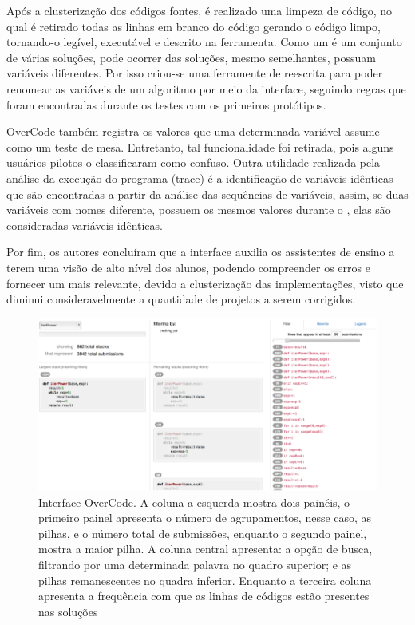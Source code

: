 	    Após a clusterização dos códigos fontes, é realizado uma limpeza de código,
	    no qual é retirado todas as linhas em branco do código gerando o código limpo,
	    tornando-o legível, executável e descrito na ferramenta. Como um 
	    é um conjunto de várias soluções, pode ocorrer das soluções, mesmo semelhantes,
	    possuam variáveis diferentes. Por isso criou-se uma ferramente de reescrita
	    para poder renomear as variáveis de um algoritmo por meio da interface,
	    seguindo regras que foram encontradas durante os testes com os primeiros protótipos.
	    
	    OverCode também registra os valores que uma determinada variável assume como
	    um teste de mesa. Entretanto, tal funcionalidade foi retirada, pois alguns
	    usuários pilotos o classificaram como confuso. Outra utilidade realizada pela
	    análise da execução do programa (trace) é a identificação de variáveis idênticas
	    que são encontradas a partir da análise das sequências de variáveis, assim, se
	    duas variáveis com nomes diferente, possuem os mesmos valores durante o
	    , elas são consideradas variáveis idênticas.
	    
	    Por fim, os autores concluíram que a interface auxilia os assistentes de
	    ensino a terem uma visão de alto nível dos alunos, podendo compreender os
	    erros e fornecer um  mais relevante, devido a clusterização
	    das implementações, visto que diminui consideravelmente a quantidade de
	    projetos a serem corrigidos.
	    
	    \begin{figure}[ht]
	        \centering
	        \includegraphics[scale=0.4]{imagem/overCode.png}
	        \caption{Interface OverCode. A coluna a esquerda mostra dois painéis, o
	        	primeiro painel apresenta o número de agrupamentos, nesse caso, as
	        	pilhas, e o número total de submissões, enquanto o segundo painel,
	        	mostra a maior pilha. A coluna central apresenta: a opção de busca,
	        	filtrando por uma determinada palavra no quadro superior; e as pilhas
	        	remanescentes no quadra inferior. Enquanto a terceira coluna apresenta
	        	a frequência com que as linhas de códigos estão presentes nas soluções}
	        \label{fig:interfaceOverCode}
	    \end{figure}
	    
